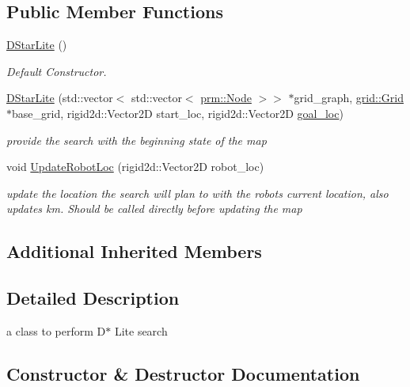 \subsection*{Public Member Functions}
\begin{DoxyCompactItemize}
\item 
\mbox{\label{classhsearch_1_1DStarLite_a0cbed5526d90c0d37261fb501be9cd0a}} 
\hyperlink{classhsearch_1_1DStarLite_a0cbed5526d90c0d37261fb501be9cd0a}{D\+Star\+Lite} ()
\begin{DoxyCompactList}\small\item\em Default Constructor. \end{DoxyCompactList}\item 
\hyperlink{classhsearch_1_1DStarLite_a45691d7cc0afb3ba17e6676bfd96c878}{D\+Star\+Lite} (std\+::vector$<$ std\+::vector$<$ \hyperlink{structprm_1_1Node}{prm\+::\+Node} $>$$>$ $\ast$grid\+\_\+graph, \hyperlink{classgrid_1_1Grid}{grid\+::\+Grid} $\ast$base\+\_\+grid, rigid2d\+::\+Vector2D start\+\_\+loc, rigid2d\+::\+Vector2D \hyperlink{classhsearch_1_1HSearch_a201d281d6a8d9fcc4158772f862d1847}{goal\+\_\+loc})
\begin{DoxyCompactList}\small\item\em provide the search with the beginning state of the map \end{DoxyCompactList}\item 
void \hyperlink{classhsearch_1_1DStarLite_ab4ed525aef3cc48661458cf0e96acfb7}{Update\+Robot\+Loc} (rigid2d\+::\+Vector2D robot\+\_\+loc)
\begin{DoxyCompactList}\small\item\em update the location the search will plan to with the robot\textquotesingle{}s current location, also updates km. Should be called directly before updating the map \end{DoxyCompactList}\end{DoxyCompactItemize}
\subsection*{Additional Inherited Members}


\subsection{Detailed Description}
a class to perform D$\ast$ Lite search 

\subsection{Constructor \& Destructor Documentation}
\mbox{\label{classhsearch_1_1DStarLite_a45691d7cc0afb3ba17e6676bfd96c878}} 
